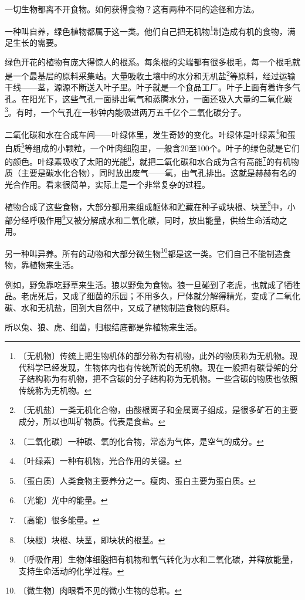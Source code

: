 \documentclass[12pt,UTF-8,openany]{ctexbook}
\begin{document}
\begin{normalsize}
    
    一切生物都离不开食物。如何获得食物？这有两种不同的途径和方法。
    
    一种叫自养，绿色植物都属于这一类。他们自己把无机物\footnote{〔无机物〕传统上把生物机体的部分称为有机物，此外的物质称为无机物。现代科学已经发现，生物体内也有传统所说的无机物。现在一般把有碳骨架的分子结构称为有机物，把不含碳的分子结构称为无机物。一些含碳的物质也依照传统称为无机物。}制造成有机的食物，满足生长的需要。
    
    绿色开花的植物有庞大得惊人的根系。每条根的尖端都有很多根毛，每一个根毛就是一个最基层的原料采集站。大量吸收土壤中的水分和无机盐\footnote{〔无机盐〕一类无机化合物，由酸根离子和金属离子组成，是很多矿石的主要成分，所以也叫矿物质。代表是食盐。}等原料，经过运输干线——茎，源源不断送入叶子里。叶子就是一个食品工厂。叶子上面有着许多气孔。在阳光下，这些气孔一面排出氧气和蒸腾水分，一面还吸入大量的二氧化碳\footnote{〔二氧化碳〕一种碳、氧的化合物，常态为气体，是空气的成分。}。有时，一个气孔在一秒钟内能吸进两万五千亿个二氧化碳分子。
    
    二氧化碳和水在合成车间——叶绿体里，发生奇妙的变化。叶绿体是叶绿素\footnote{〔叶绿素〕一种有机物，光合作用的关键。}和蛋白质\footnote{〔蛋白质〕人类食物主要养分之一。瘦肉、蛋白主要为蛋白质。}等组成的小颗粒，一个叶肉细胞里，一般含20至100个。叶子的绿色就是它们的颜色。叶绿素吸收了太阳的光能\footnote{〔光能〕光中的能量。}，就把二氧化碳和水合成为含有高能\footnote{〔高能〕很多能量。}的有机物质（主要是碳水化合物），同时放出废气——氧，由气孔排出。这就是赫赫有名的光合作用。看来很简单，实际上是一个非常复杂的过程。
    
    植物合成了这些食物，大部分都用来组成躯体和贮藏在种子或块根、块茎\footnote{〔块根〕块根、块茎，即块状的根茎。}中，小部分经呼吸作用\footnote{〔呼吸作用〕生物体细胞把有机物和氧气转化为水和二氧化碳，并释放能量，支持生命活动的化学过程。}又被分解成水和二氧化碳，同时，放出能量，供给生命活动之用。
    
    另一种叫异养。所有的动物和大部分微生物\footnote{〔微生物〕肉眼看不见的微小生物的总称。}都是这一类。它们自己不能制造食物，靠植物来生活。
    
    例如，野兔靠吃野草来生活。狼以野兔为食物。狼一旦碰到了老虎，也就成了牺牲品。老虎死后，又成了细菌的乐园；不用多久，尸体就分解得精光，变成了二氧化碳、水和无机盐，回到大自然中，又成了植物制造食物的原料。
    
    所以兔、狼、虎、细菌，归根结底都是靠植物来生活。
    

\end{normalsize}
\end{document}
